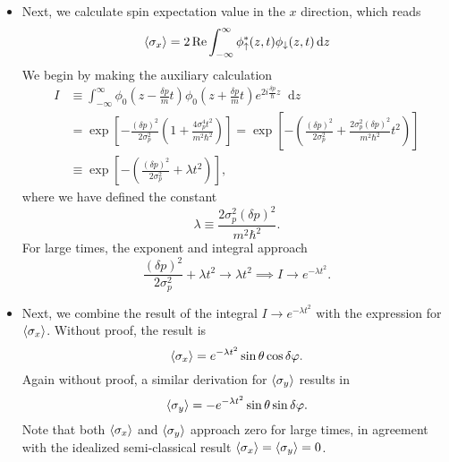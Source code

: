 \documentclass[11pt, a4paper]{article}
\newcommand{\diff}{\mathop{}\!\mathrm{d}} %
\newcommand{\ua}{\uparrow}  %
\newcommand{\da}{\downarrow}  %
\begin{document}
\begin{itemize}
    \item Next, we calculate spin expectation value in the $ x $ direction, which reads
    \begin{equation*}
        \ev{\sigma_{x}} = 2 \Re \int_{-\infty}^{\infty}\phi_{\ua}^{*}(z, t)\phi_{\da}(z, t)\diff z
    \end{equation*}
    We begin by making the auxiliary calculation 
    \begin{align*}
        I & \equiv \int_{-\infty}^{\infty}\phi_{0}\left( z - \frac{\delta p}{m}t \right)\phi_{0}\left( z + \frac{\delta p}{m}t \right)e^{2i \frac{\delta p}{\hbar}z}\diff z\\
        & = \exp \left[ - \frac{(\delta p)^{2}}{2 \sigma_{p}^{2}} \left( 1 + \frac{4 \sigma_{p}^{4}t^{2}}{m^{2}\hbar^{2}} \right) \right]
         = \exp \left[ - \left( \frac{(\delta p)^{2}}{2\sigma_{p}^{2}} + \frac{2 \sigma_{p}^{2} (\delta p)^{2}}{m^{2} \hbar^{2}}t^{2} \right) \right]\\
        &\equiv \exp \left[ - \left( \frac{(\delta p)^{2}}{2\sigma_{p}^{2}} + \lambda t^{2} \right) \right],
    \end{align*}
    where we have defined the constant
    \begin{equation*}
        \lambda \equiv \frac{2 \sigma_{p}^{2}(\delta p)^{2}}{m^{2}\hbar^{2}}.
    \end{equation*}
    For large times, the exponent and integral approach
    \begin{equation*}
        \frac{(\delta p)^{2}}{2\sigma_{p}^{2}} + \lambda t^{2} \to \lambda t^{2} \implies I \to e^{- \lambda t^{2}}.
    \end{equation*}

    \item Next, we combine the result of the integral $ I \to e^{-\lambda t^{2} } $ with the expression for $ \ev{\sigma_{x}} $. Without proof, the result is
    \begin{equation*}
        \ev{\sigma_{x}} = e^{-\lambda t^{2}} \sin \theta \cos \delta \varphi.
    \end{equation*}
    Again without proof, a similar derivation for $ \ev{\sigma_{y}} $ results in
    \begin{equation*}
        \ev{\sigma_{y}} = - e^{-\lambda t^{2}} \sin \theta \sin \delta \varphi.
    \end{equation*}
    Note that both $ \ev{\sigma_{x}} $ and $ \ev{\sigma_{y}} $ approach zero for large times, in agreement with the idealized semi-classical result $ \ev{\sigma_{x}} = \ev{\sigma_{y}} = 0 $.
    
\end{itemize}
\end{document}
